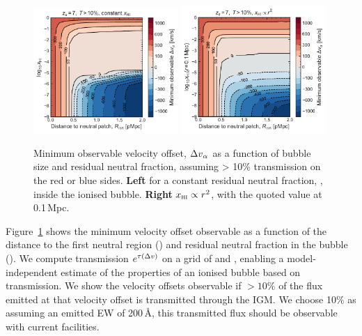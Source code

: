 \documentclass[fleqn,usenatbib]{mnras}
\begin{document}
\begin{figure}
    \includegraphics[width=0.49\textwidth]{figs/fig5a.pdf}
    \includegraphics[width=0.49\textwidth]{figs/fig5b.pdf}
    \caption{Minimum observable \lya velocity offset, $\DV_\alpha$ as a function of bubble size and residual neutral fraction, assuming > 10\% transmission on the red or blue sides. \textbf{Left} for a constant residual neutral fraction, \xHI, inside the ionised bubble. \textbf{Right} $\xHI \propto r^2$, with the quoted value at 0.1\,Mpc.}
    \label{fig:lya_transmission_minDV}
\end{figure}

Figure~\ref{fig:lya_transmission_minDV} shows the minimum \lya velocity offset observable as a function of the distance to the first neutral region (\Rion) and residual neutral fraction in the bubble (\xHI). We compute \lya transmission $e^{\tau(\DV)}$ on a grid of \Rion and \xHI, enabling a model-independent estimate of the properties of an ionised bubble based on \lya transmission. We show the velocity offsets observable if $>10\%$ of the flux emitted at that velocity offset is transmitted through the IGM. We choose 10\% as assuming an emitted \lya EW of 200\,\AA, this transmitted flux should be observable with current facilities.
\end{document}
